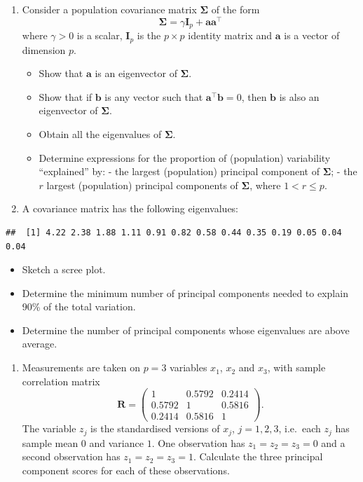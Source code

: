 \documentclass[]{book}
\providecommand{\tightlist}{%
  \setlength{\itemsep}{0pt}\setlength{\parskip}{0pt}}
\theoremstyle{definition}
\theoremstyle{definition}
\theoremstyle{definition}
\theoremstyle{remark}
\begin{document}
\begin{enumerate}
\def\labelenumi{\arabic{enumi}.}
\setcounter{enumi}{1}
\tightlist
\item
  Consider a population covariance matrix \(\boldsymbol \Sigma\) of the form
  \[\boldsymbol \Sigma=\gamma \mathbf I_p + \boldsymbol a\boldsymbol a^\top\]
  where \(\gamma>0\) is a scalar, \(\mathbf I_p\) is the \(p \times p\) identity matrix and \(\boldsymbol a\) is a vector of dimension \(p\).

  \begin{itemize}
  \tightlist
  \item
    Show that \(\boldsymbol a\) is an eigenvector of \(\boldsymbol \Sigma\).
  \item
    Show that if \(\boldsymbol b\) is any vector such that \(\boldsymbol a^\top \boldsymbol b=0\), then \(\boldsymbol b\) is also an eigenvector of \(\boldsymbol \Sigma\).
  \item
    Obtain all the eigenvalues of \(\boldsymbol \Sigma\).
  \item
    Determine expressions for the proportion of (population) variability ``explained'' by:
    - the largest (population) principal component of \(\boldsymbol \Sigma\);
    - the \(r\) largest (population) principal components of \(\boldsymbol \Sigma\), where \(1 < r \leq p\).
  \end{itemize}
\item
  A covariance matrix has the following eigenvalues:
\end{enumerate}

\begin{verbatim}
##  [1] 4.22 2.38 1.88 1.11 0.91 0.82 0.58 0.44 0.35 0.19 0.05 0.04 0.04
\end{verbatim}

\begin{itemize}
\tightlist
\item
  Sketch a scree plot.
\item
  Determine the minimum number of principal components needed to explain 90\% of the total variation.
\item
  Determine the number of principal components whose eigenvalues are above average.
\end{itemize}

\begin{enumerate}
\def\labelenumi{\arabic{enumi}.}
\setcounter{enumi}{3}
\tightlist
\item
  Measurements are taken on \(p=3\) variables \(x_1\), \(x_2\) and \(x_3\), with sample correlation matrix
  \[
   \boldsymbol R= \begin{pmatrix} 1 & 0.5792 & 0.2414 \\ 0.5792 & 1 & 0.5816 \\ 0.2414 & 0.5816 & 1 \end{pmatrix}.
  \]
  The variable \(z_j\) is the standardised versions of \(x_j\), \(j=1,2,3\), i.e.~each \(z_j\) has sample mean \(0\) and variance \(1\).
  One observation has \(z_1 = z_2 = z_3 = 0\) and a second observation has \(z_1 = z_2 = z_3 =1\). Calculate the three
  principal component scores for
  each of these observations.
\end{enumerate}
\end{document}
